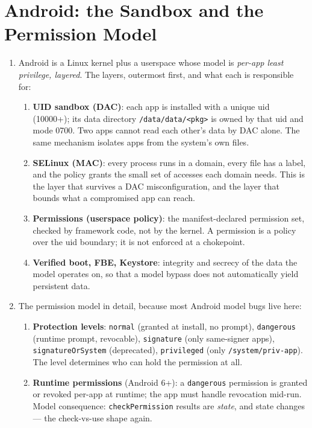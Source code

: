 \documentclass[12pt]{Training}
\begin{document}
\section*{Android: the Sandbox and the Permission Model}
\begin{enumerate}
    \item Android is a Linux kernel plus a userspace whose model is \emph{per-app least privilege, layered}. The layers, outermost first, and what each is responsible for:
    \begin{enumerate}
        \item \textbf{UID sandbox (DAC)}: each app is installed with a unique uid (10000+); its data directory \lstinline{/data/data/<pkg>} is owned by that uid and mode 0700. Two apps cannot read each other's data by DAC alone. The same mechanism isolates apps from the system's own files.
        \item \textbf{SELinux (MAC)}: every process runs in a domain, every file has a label, and the policy grants the small set of accesses each domain needs. This is the layer that survives a DAC misconfiguration, and the layer that bounds what a compromised app can reach.
        \item \textbf{Permissions (userspace policy)}: the manifest-declared permission set, checked by framework code, not by the kernel. A permission is a policy over the uid boundary; it is not enforced at a chokepoint.
        \item \textbf{Verified boot, FBE, Keystore}: integrity and secrecy of the data the model operates on, so that a model bypass does not automatically yield persistent data.
    \end{enumerate}
    \item The permission model in detail, because most Android model bugs live here:
    \begin{enumerate}
        \item \textbf{Protection levels}: \lstinline{normal} (granted at install, no prompt), \lstinline{dangerous} (runtime prompt, revocable), \lstinline{signature} (only same-signer apps), \lstinline{signatureOrSystem} (deprecated), \lstinline{privileged} (only \lstinline{/system/priv-app}). The level determines who can hold the permission at all.
        \item \textbf{Runtime permissions} (Android 6+): a \lstinline{dangerous} permission is granted or revoked per-app at runtime; the app must handle revocation mid-run. Model consequence: \lstinline{checkPermission} results are \emph{state}, and state changes --- the check-vs-use shape again.

\end{enumerate}
\end{enumerate}
\end{document}
